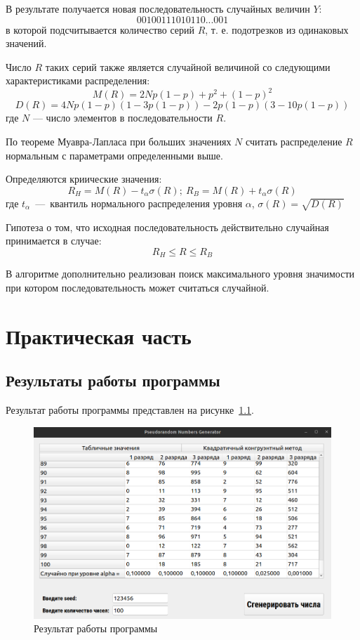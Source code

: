 В результате получается новая последовательность случайных величин $Y$:
\begin{equation}
    00100111010110...001
\end{equation}
в которой подсчитывается количество серий $R$, т. е. подотрезков из одинаковых значений.

Число $R$ таких серий также является случайной величиной со следующими характеристиками распределения:
\begin{equation}
    M(R) = 2Np(1-p)+p^2+(1-p)^2
\end{equation}
\begin{equation}
    D(R) = 4Np(1-p)(1-3p(1-p))-2p(1-p)(3-10p(1-p))
\end{equation}
где $N$ --- число элементов в последовательности $R$. 

По теореме Муавра-Лапласа при больших значениях $N$ считать распределение $R$ нормальным с параметрами определенными выше.

Определяются криические значения:
\begin{equation}
    R_H=M(R) - t_\alpha \sigma(R);\ R_B = M(R)+t_\alpha \sigma(R)
\end{equation}
где $t_\alpha$~---~квантиль нормального распределения уровня $\alpha$, $\sigma(R) = \sqrt{D(R)}$

Гипотеза о том, что исходная последовательность действительно случайная принимается в случае:
\begin{equation}
    R_H \leq R \leq R_B
\end{equation}

В алгоритме дополнительно реализован поиск максимального уровня значимости при котором последовательность может считаться случайной.

\chapter{Практическая часть}
\section{Результаты работы программы}

Результат работы программы представлен на рисунке~\ref{fig:res}.

\begin{figure}[H]
    \centering
    \includegraphics[width=1\linewidth]{images/prng.png}
    \caption{Результат работы программы}
    \label{fig:res}
\end{figure}